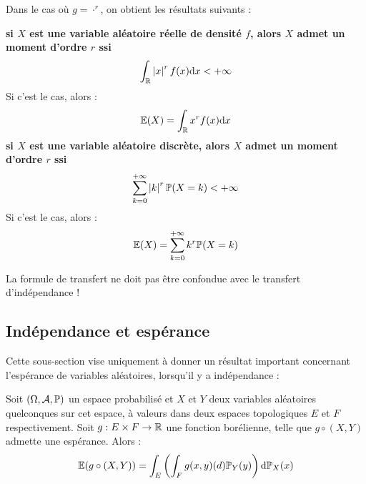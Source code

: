 \documentclass[../integ-proba.tex]{subfiles}
\begin{document}
\begin{rem}
        Dans le cas où $g = \cdot^r$, on obtient les résultats suivants :
        \begin{itemize}
            \itemb \textbf{si $X$ est une variable aléatoire réelle de densité $f$, alors $X$ admet un moment d'ordre $r$ ssi}
            \begin{displaymath}
                \int_{\mathbb{R}} \left|x\right|^r f(x) \textnormal{d}x < + \infty
            \end{displaymath}
            Si c'est le cas, alors :
            \begin{displaymath}
                \mathbb{E}(X) = \int_{\mathbb{R}} x^r f(x) \textnormal{d}x
            \end{displaymath}
            \itemb \textbf{si $X$ est une variable aléatoire discrète, alors $X$ admet un moment d'ordre $r$ ssi}
            \begin{displaymath}
                \sum_{k=0}^{+\infty} \left|k\right|^r \mathbb{P}(X=k) < + \infty
            \end{displaymath}
            Si c'est le cas, alors :
            \begin{displaymath}
                \mathbb{E}(X) = \sum_{k=0}^{+\infty} k^r \mathbb{P}(X=k)
            \end{displaymath}
        \end{itemize}
    \end{rem}

    \begin{rem}
        La formule de transfert ne doit pas être confondue avec le transfert d'indépendance !
    \end{rem}

    \subsection{Indépendance et espérance}

    Cette sous-section vise uniquement à donner un résultat important concernant l'espérance de variables aléatoires, lorsqu'il y a indépendance :

    \begin{thm}
        \label{thm:independance_esperance}
        Soit $\left( \Omega, \mathcal{A}, \mathbb{P} \right)$ un espace probabilisé et $X$ et $Y$ deux variables aléatoires quelconques sur cet espace, à valeurs dans deux espaces topologiques $E$ et $F$ respectivement.
        Soit $g:E \times F \rightarrow \mathbb{R}$ une fonction borélienne, telle que $g \circ \left( X, Y \right)$ admette une espérance.
        Alors :
        \begin{displaymath}
            \mathbb{E}(g \circ (X,Y)) = \int_E \left( \int_F g(x,y) \textnormal(d) \mathbb{P}_Y(y)\right) \textnormal{d} \mathbb{P}_X(x)
        \end{displaymath}
    \end{thm}
\end{document}
